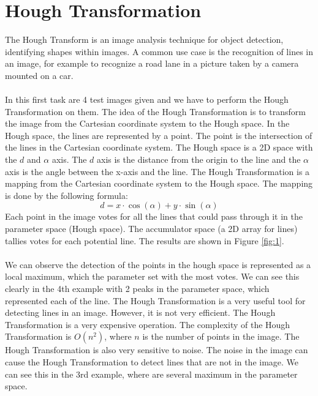 \documentclass[12pt
,headinclude
,headsepline
,bibtotocnumbered
]{scrartcl}
\begin{document}
\section*{Hough Transformation}
The Hough Transform is an image analysis technique for object detection, identifying shapes within images. A common use case is the recognition of lines in an image, for example to recognize a road lane in a picture taken by a camera mounted on a car.
\\\\ In this first task are 4 test images given and we have to perform the Hough Transformation on them. The idea of the Hough Transformation is to transform the image from the Cartesian coordinate system to the Hough space. In the Hough space, the lines are represented by a point. The point is the intersection of the lines in the Cartesian coordinate system. The Hough space is a 2D space with the $d$ and $\alpha$ axis. The $d$ axis is the distance from the origin to the line and the $\alpha$ axis is the angle between the x-axis and the line. The Hough Transformation is a mapping from the Cartesian coordinate system to the Hough space. The mapping is done by the following formula:
\begin{equation*}
d = x \cdot \cos(\alpha) + y \cdot \sin(\alpha)
\end{equation*}
Each point in the image votes for all the lines that could pass through it in the parameter space (Hough space). The accumulator space (a 2D array for lines) tallies votes for each potential line. The results are shown in Figure \ref{fig:1}.
\\\\ We can observe the detection of the points in the hough space is represented as a local maximum, which the parameter set with the most votes. We can see this clearly in the 4th example with 2 peaks in the parameter space, which represented each of the line. The Hough Transformation is a very useful tool for detecting lines in an image. However, it is not very efficient. The Hough Transformation is a very expensive operation. The complexity of the Hough Transformation is $O(n^2)$, where $n$ is the number of points in the image. The Hough Transformation is also very sensitive to noise. The noise in the image can cause the Hough Transformation to detect lines that are not in the image. We can see this in the 3rd example, where are several maximum in the parameter space.
\end{document}
